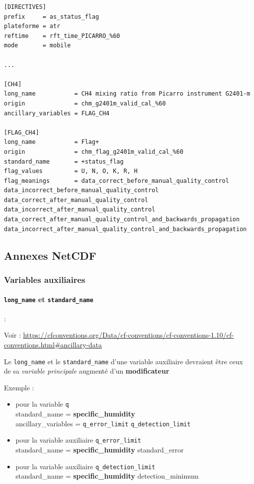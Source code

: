\begin{landscape}
\begin{Verbatim}[fontsize=\myfontsize, commandchars=\\\{\}]
[DIRECTIVES]
prefix     = as_status_flag
plateforme = atr
reftime    = rft_time_PICARRO_%60
mode       = mobile

...

[CH4]
long_name           = CH4 mixing ratio from Picarro instrument G2401-m
origin              = chm_g2401m_valid_cal_%60
ancillary_variables = FLAG_CH4

[FLAG_CH4]
long_name           = Flag+
origin              = chm_flag_g2401m_valid_cal_%60
standard_name       = +status_flag
flag_values         = U, N, O, K, R, H
flag_meanings       = data_correct_before_manual_quality_control data_incorrect_before_manual_quality_control data_correct_after_manual_quality_control data_incorrect_after_manual_quality_control data_correct_after_manual_quality_control_and_backwards_propagation data_incorrect_after_manual_quality_control_and_backwards_propagation
\end{Verbatim}

\end{landscape}
\restoregeometry


\subsection{Annexes NetCDF}\label{ref:annexes}

\subsubsection{Variables auxiliaires}


\paragraph{\texttt{long\_name} et \texttt{standard\_name}} :

Voir :
\url{https://cfconventions.org/Data/cf-conventions/cf-conventions-1.10/cf-conventions.html\#ancillary-data}

Le \texttt{long\_name} et le \texttt{standard\_name} d'une variable
auxiliaire devraient être ceux de sa \textit{variable principale} augmenté
d'un \textbf{modificateur}

Exemple :

\begin{itemize}
\item
  pour la variable \texttt{q}\\
  standard\_name = \textbf{specific\_humidity}\\
  ancillary\_variables = \texttt{q\_error\_limit}
  \texttt{q\_detection\_limit}
\item
  pour la variable auxiliaire \texttt{q\_error\_limit}\\
  standard\_name = \textbf{specific\_humidity} {standard\_error}
\item
  pour la variable auxiliaire \texttt{q\_detection\_limit}\\
  standard\_name = \textbf{specific\_humidity} {detection\_minimum}
\end{itemize}

